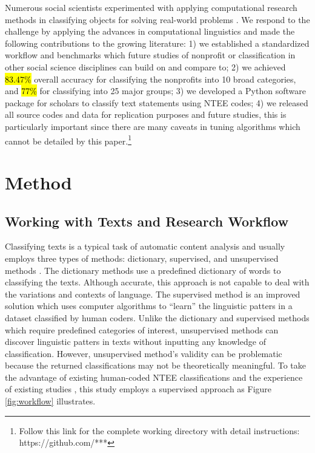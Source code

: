 \documentclass[11pt]{article}
\begin{document}
Numerous social scientists experimented with applying computational research methods in classifying objects for solving real-world problems \parencite[e.g.,][]{BacakPrincipledMachineLearning2018,NelsonFutureCodingComparison2018,FyallNTEECodesOpportunities2018,GrimmerTextDataPromise2013}. We respond to the challenge by applying the advances in computational linguistics and made the following contributions to the growing literature: 1) we established a standardized workflow and benchmarks which future studies of nonprofit or classification in other social science disciplines can build on and compare to; 2) we achieved \hl{83.47\%} overall accuracy for classifying the nonprofits into 10 broad categories, and \hl{77\%} for classifying into 25 major groups; 3) we developed a Python software package for scholars to classify text statements using NTEE codes; 4) we released all source codes and data for replication purposes and future studies, this is particularly important since there are many caveats in tuning algorithms which cannot be detailed by this paper.\footnote{Follow this link for the complete working directory with detail instructions: https://github.com/***}


\section{Method}

\subsection{Working with Texts and Research Workflow}

Classifying texts is a typical task of automatic content analysis and usually employs three types of methods: dictionary, supervised, and unsupervised methods \parencite[268-269]{GrimmerTextDataPromise2013}. The dictionary methods use a predefined dictionary of words to classifying the texts. Although accurate, this approach is not capable to deal with the variations and contexts of language. The supervised method is an improved solution which uses computer algorithms to ``learn'' the linguistic patters in a dataset classified by human coders. Unlike the dictionary and supervised methods which require predefined categories of interest, unsupervised methods can discover linguistic patters in texts without inputting any knowledge of classification. However, unsupervised method's validity can be problematic because the returned classifications may not be theoretically meaningful. To take the advantage of existing human-coded NTEE classifications and the experience of existing studies \parencite{NelsonFutureCodingComparison2018,FyallNTEECodesOpportunities2018}, this study employs a supervised approach as Figure \ref{fig:workflow} illustrates.
\end{document}
